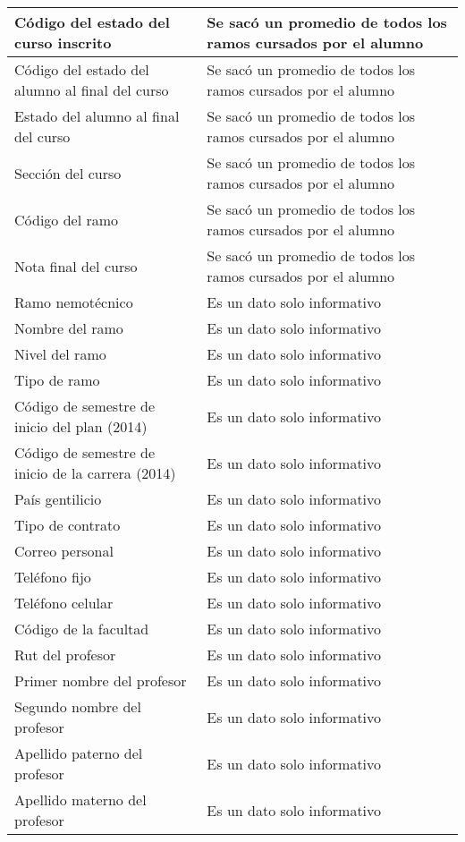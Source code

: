 \begin{longtable}{| p{5cm}| p{7cm} |}
	Código del estado del curso inscrito & Se sacó un promedio de todos los ramos cursados por el alumno	\\ \hline
	Código del estado del alumno al final del curso & Se sacó un promedio de todos los ramos cursados por el alumno	\\ \hline
	Estado del alumno al final del curso & Se sacó un promedio de todos los ramos cursados por el alumno	\\ \hline
	Sección del curso & Se sacó un promedio de todos los ramos cursados por el alumno	\\ \hline
	Código del ramo & Se sacó un promedio de todos los ramos cursados por el alumno	\\ \hline
	Nota final del curso & Se sacó un promedio de todos los ramos cursados por el alumno	\\ \hline
	Ramo nemotécnico & Es un dato solo informativo 	\\ \hline
	Nombre del ramo & Es un dato solo informativo	\\ \hline
	Nivel del ramo & Es un dato solo informativo	\\ \hline
	Tipo de ramo & Es un dato solo informativo	\\ \hline
	Código de semestre de inicio del plan (2014) & Es un dato solo informativo	\\ \hline
	Código de semestre de inicio de la carrera (2014) & Es un dato solo informativo	\\ \hline
	País gentilicio & Es un dato solo informativo	\\ \hline
	Tipo de contrato & Es un dato solo informativo	\\ \hline
	Correo personal & Es un dato solo informativo	\\ \hline
	Teléfono fijo & Es un dato solo informativo	\\ \hline
	Teléfono celular & Es un dato solo informativo	\\ \hline
	Código de la facultad & Es un dato solo informativo	\\ \hline
	Rut del profesor & Es un dato solo informativo\\ \hline
	Primer nombre del profesor & Es un dato solo informativo	\\ \hline
	Segundo nombre del profesor & Es un dato solo informativo	\\ \hline
	Apellido paterno del profesor & Es un dato solo informativo	\\ \hline
	Apellido materno del profesor & Es un dato solo informativo	\\ \hline

\end{longtable}
